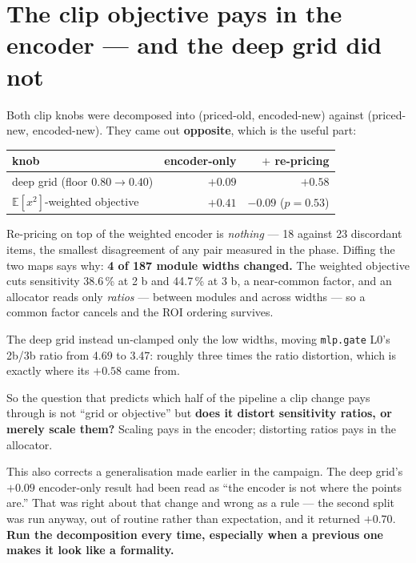 \documentclass[11pt]{article}
\newcommand{\pct}{\,\%}
\newcommand{\code}[1]{\texttt{#1}}
\newcommand{\best}[1]{\textbf{#1}}
\newenvironment{aside}%
{\par\needspace{4\baselineskip}\vspace{0.8ex}%
\begin{lrbox}{\asidebox}\begin{minipage}{\dimexpr\textwidth-18pt\relax}\small}%
{\end{minipage}\end{lrbox}%
\noindent\setlength{\fboxsep}{9pt}\colorbox{warnbg}{\usebox{\asidebox}}%
\vspace{0.6ex}\par}
\begin{document}
\section{The clip objective pays in the encoder --- and the deep grid did not}
\label{sec:clip}

Both clip knobs were decomposed into (priced-old, encoded-new) against (priced-new, encoded-new).
They came out \textbf{opposite}, which is the useful part:

\begin{center}\small
\begin{tabular}{@{}lrr@{}}
\toprule
knob & encoder-only & $+$ re-pricing \\
\midrule
deep grid (floor $0.80 \to 0.40$) & $+0.09$ & \best{$+0.58$} \\
$\mathbb{E}[x^2]$-weighted objective & \best{$+0.41$} & $-0.09$ ($p = 0.53$) \\
\bottomrule
\end{tabular}
\end{center}

Re-pricing on top of the weighted encoder is \emph{nothing} --- 18 against 23 discordant items, the
smallest disagreement of any pair measured in the phase. Diffing the two maps says why:
\textbf{4 of 187 module widths changed.} The weighted objective cuts sensitivity 38.6\pct{} at 2 b
and 44.7\pct{} at 3 b, a near-common factor, and an allocator reads only \emph{ratios} --- between
modules and across widths --- so a common factor cancels and the ROI ordering survives.

The deep grid instead un-clamped only the low widths, moving \code{mlp.gate} L0's 2b/3b ratio from
4.69 to 3.47: roughly three times the ratio distortion, which is exactly where its $+0.58$ came
from.

\begin{aside}
So the question that predicts which half of the pipeline a clip change pays through is not ``grid
or objective'' but \textbf{does it distort sensitivity ratios, or merely scale them?} Scaling pays
in the encoder; distorting ratios pays in the allocator.
\end{aside}

This also corrects a generalisation made earlier in the campaign. The deep grid's $+0.09$
encoder-only result had been read as ``the encoder is not where the points are.'' That was right
about that change and wrong as a rule --- the second split was run anyway, out of routine rather
than expectation, and it returned $+0.70$. \textbf{Run the decomposition every time, especially
when a previous one makes it look like a formality.}
\end{document}
